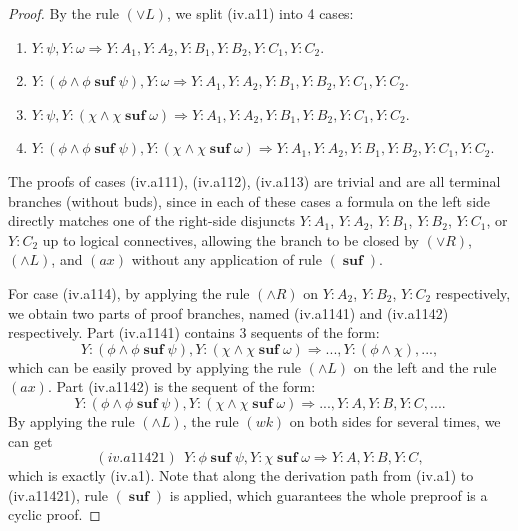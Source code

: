 \documentclass[manuscript,screen]{acmart}
\DeclareMathOperator{\osuf}{\mathbf{suf}}
\begin{document}
\begin{proof}
By the rule $(\vee L)$, we split (iv.a11) into 4 cases: 
\begin{enumerate}
    \item[(iv.a111)] $Y : \psi, Y : \omega\Rightarrow Y : A_1, Y : A_2, Y : B_1, Y : B_2, Y : C_1, Y : C_2$.
    \item[(iv.a112)] $Y : (\phi\wedge \phi\osuf \psi), Y : \omega\Rightarrow Y : A_1, Y : A_2, Y : B_1, Y : B_2, Y : C_1, Y : C_2$.
    \item[(iv.a113)] $Y : \psi, Y : (\chi\wedge \chi\osuf \omega)\Rightarrow Y : A_1, Y : A_2, Y : B_1, Y : B_2, Y : C_1, Y : C_2$.
    \item[(iv.a114)] $Y : (\phi\wedge \phi\osuf \psi), Y : (\chi\wedge \chi\osuf \omega)\Rightarrow Y : A_1, Y : A_2, Y : B_1, Y : B_2, Y : C_1, Y : C_2$.
\end{enumerate}
The proofs of cases (iv.a111), (iv.a112), (iv.a113) are trivial and are all terminal branches (without buds), since in each of these cases a formula on the left side directly matches one of the right-side disjuncts $Y : A_1$, $Y : A_2$, $Y : B_1$, $Y : B_2$, $Y : C_1$, or $Y : C_2$ up to logical connectives, allowing the branch to be closed by $(\vee R)$, $(\wedge L)$, and $(ax)$ without any application of rule $(\osuf)$.

For case (iv.a114), by applying the rule $(\wedge R)$ on $Y : A_2$, $Y : B_2$, $Y : C_2$ respectively, we obtain two parts of proof branches, named (iv.a1141) and (iv.a1142) respectively. 
Part (iv.a1141) contains 3 sequents of the form: 
$$
Y : (\phi\wedge \phi\osuf \psi), Y : (\chi\wedge \chi\osuf \omega)\Rightarrow ..., Y : (\phi\wedge \chi),..., 
$$
which can be easily proved by applying the rule $(\wedge L)$ on the left and the rule $(\textit{ax})$. 
Part (iv.a1142) is the sequent of the form:  
$$
Y : (\phi\wedge \phi\osuf \psi), Y : (\chi\wedge \chi\osuf \omega)\Rightarrow ..., Y : A, Y : B, Y : C, ....
$$
By applying the rule $(\wedge L)$, the rule $(\textit{wk})$ on both sides for several times, we can get 
$$
(iv.a11421)\ \ Y : \phi\osuf \psi, Y : \chi\osuf\omega\Rightarrow Y : A, Y : B, Y : C, 
$$
which is exactly (iv.a1). 
Note that along the derivation path from (iv.a1) to (iv.a11421), rule $(\osuf)$ is applied, which guarantees the whole preproof is a cyclic proof. 
\fi


\end{proof}
\end{document}

